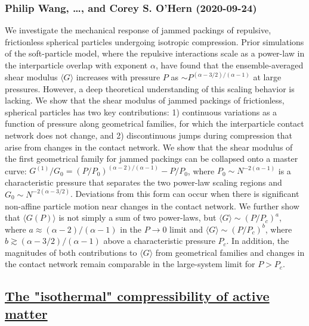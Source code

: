 \subsubsection*{Philip Wang, \dots, and Corey S. O'Hern (2020-09-24)}
We investigate the mechanical response of jammed packings of repulsive,
frictionless spherical particles undergoing isotropic compression. Prior
simulations of the soft-particle model, where the repulsive interactions scale
as a power-law in the interparticle overlap with exponent $\alpha$, have found
that the ensemble-averaged shear modulus $\langle G \rangle$ increases with
pressure $P$ as $\sim P^{(\alpha-3/2)/(\alpha-1)}$ at large pressures. However,
a deep theoretical understanding of this scaling behavior is lacking. We show
that the shear modulus of jammed packings of frictionless, spherical particles
has two key contributions: 1) continuous variations as a function of pressure
along geometrical families, for which the interparticle contact network does
not change, and 2) discontinuous jumps during compression that arise from
changes in the contact network. We show that the shear modulus of the first
geometrical family for jammed packings can be collapsed onto a master curve:
$G^{(1)}/G_0 = (P/P_0)^{(\alpha-2)/(\alpha-1)} - P/P_0$, where $P_0 \sim
N^{-2(\alpha-1)}$ is a characteristic pressure that separates the two power-law
scaling regions and $G_0 \sim N^{-2(\alpha-3/2)}$. Deviations from this form
can occur when there is significant non-affine particle motion near changes in
the contact network. We further show that $\langle G (P)\rangle$ is not simply
a sum of two power-laws, but $\langle G \rangle \sim (P/P_c)^a$, where $a
\approx (\alpha -2)/(\alpha-1)$ in the $P \rightarrow 0$ limit and $\langle G
\rangle \sim (P/P_c)^b$, where $b \gtrsim (\alpha -3/2)/(\alpha-1)$ above a
characteristic pressure $P_c$. In addition, the magnitudes of both
contributions to $\langle G\rangle$ from geometrical families and changes in
the contact network remain comparable in the large-system limit for $P >P_c$.

\subsection*{\href{http://arxiv.org/abs/2009.11439v1}{The "isothermal" compressibility of active matter}}
